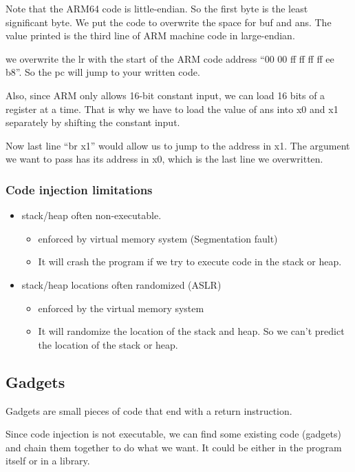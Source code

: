 \documentclass[letterpaper,12pt]{article}
\begin{document}
Note that the ARM64 code is little-endian. So the first byte is the least
significant byte. We put the code to overwrite the space for buf and ans. The
value printed is the third line of ARM machine code in large-endian.

we overwrite the lr with the start of the ARM code address ``00 00 ff ff ff ff
ee b8''. So the pc will jump to your written code.

Also, since ARM only allows 16-bit constant input, we can load 16 bits of a
register at a time. That is why we have to load the value of ans into x0 and x1
separately by shifting the constant input.

Now last line ``br x1'' would allow us to jump to the address in x1. The
argument we want to pass has its address in x0, which is the last line we
overwritten.

\subsubsection{Code injection limitations}
\begin{itemize}
    \item stack/heap often non-executable.\begin{itemize}
              \item enforced by virtual memory system (Segmentation fault)
              \item It will crash the program if we try to execute code in the stack or heap.
          \end{itemize}
    \item stack/heap locations often randomized (ASLR) \begin{itemize}
              \item enforced by the virtual memory system
              \item It will randomize the location of the stack and heap. So we can't predict the
                    location of the stack or heap.
          \end{itemize}
\end{itemize}

\subsection{Gadgets}
Gadgets are small pieces of code that end with a return instruction.

Since code injection is not executable, we can find some existing code
(gadgets) and chain them together to do what we want. It could be either in the
program itself or in a library.
\end{document}
